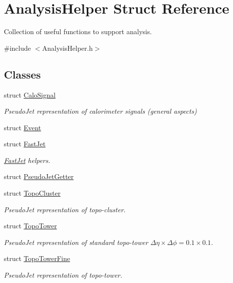 \hypertarget{structAnalysisHelper}{}\section{Analysis\+Helper Struct Reference}
\label{structAnalysisHelper}


Collection of useful functions to support analysis.  




{\ttfamily \#include $<$Analysis\+Helper.\+h$>$}

\subsection*{Classes}
\begin{DoxyCompactItemize}
\item 
struct \hyperlink{structAnalysisHelper_1_1CaloSignal}{Calo\+Signal}
\begin{DoxyCompactList}\small\item\em Pseudo\+Jet representation of calorimeter signals (general aspects) \end{DoxyCompactList}\item 
struct \hyperlink{structAnalysisHelper_1_1Event}{Event}
\item 
struct \hyperlink{structAnalysisHelper_1_1FastJet}{Fast\+Jet}
\begin{DoxyCompactList}\small\item\em \hyperlink{structAnalysisHelper_1_1FastJet}{Fast\+Jet} helpers. \end{DoxyCompactList}\item 
struct \hyperlink{structAnalysisHelper_1_1PseudoJetGetter}{Pseudo\+Jet\+Getter}
\item 
struct \hyperlink{structAnalysisHelper_1_1TopoCluster}{Topo\+Cluster}
\begin{DoxyCompactList}\small\item\em Pseudo\+Jet representation of topo-\/cluster. \end{DoxyCompactList}\item 
struct \hyperlink{structAnalysisHelper_1_1TopoTower}{Topo\+Tower}
\begin{DoxyCompactList}\small\item\em Pseudo\+Jet representation of standard topo-\/tower $ \Delta\eta\times\Delta\phi = 0.1\times 0.1 $. \end{DoxyCompactList}\item 
struct \hyperlink{structAnalysisHelper_1_1TopoTowerFine}{Topo\+Tower\+Fine}
\begin{DoxyCompactList}\small\item\em Pseudo\+Jet representation of topo-\/tower. \end{DoxyCompactList}\end{DoxyCompactItemize}
